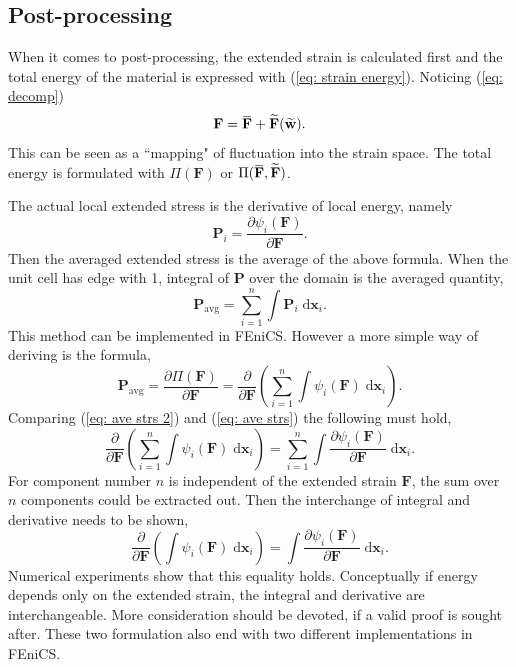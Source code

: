 \documentclass[10pt,a4paper]{scrreprt}
\newcommand{\myd}{\;\mathrm{d}}
\newcommand{\overbar}[1]{\mkern 1.5mu\overline{\mkern-1.5mu#1\mkern-1.5mu}\mkern 1.5mu}
\begin{document}
\subsection{Post-processing}
When it comes to post-processing, the extended strain is calculated first and the total energy of the material is expressed with (\ref{eq: strain energy}). Noticing (\ref{eq: decomp})
\begin{equation}
\mathbf{F} = \overbar{\mathbf{F}} + \widetilde{\mathbf{F}}(\widetilde{\mathbf{w}}).
\end{equation}
This can be seen as a ``mapping" of fluctuation into the strain space. The total energy is formulated with $\Pi(\mathbf{F})$ or $\Pi(\overbar{\mathbf{F}},\widetilde{\mathbf{F}})$.

The actual local extended stress is the derivative of local energy, namely
\begin{equation}
\label{eq: loc en}
\mathbf{P}_{i} = \dfrac{\partial \psi_{i}(\mathbf{F})}{\partial \mathbf{F}}.
\end{equation}
Then the averaged extended stress is the average of the above formula. When the unit cell has edge with 1, integral of $\mathbf{P}$ over the domain is the averaged quantity,
\begin{equation}
\label{eq: ave strs}
\mathbf{P}_{\text{avg}} = \sum^{n}_{i=1} \int \mathbf{P}_{i} \myd{\mathbf{x}_{i}}.
\end{equation}
This method can be implemented in FEniCS. However a more simple way of deriving is the formula,
\begin{equation}
\label{eq: ave strs 2}
\mathbf{P}_{\text{avg}} = \dfrac{\partial \Pi(\mathbf{F})}{\partial \mathbf{F}} = \dfrac{\partial}{\partial \mathbf{F}} \left( \sum^{n}_{i=1} \int \psi_{i}(\mathbf{F}) \myd{\mathbf{x}_{i}} \right).
\end{equation}
Comparing (\ref{eq: ave strs 2}) and (\ref{eq: ave strs}) the following must hold,
\begin{equation}
\label{eq: equality}
\dfrac{\partial}{\partial \mathbf{F}} \left( \sum^{n}_{i=1} \int \psi_{i}(\mathbf{F}) \myd{\mathbf{x}_{i}} \right) = \sum^{n}_{i=1} \int \dfrac{\partial \psi_{i}(\mathbf{F})}{\partial \mathbf{F}} \myd{\mathbf{x}_{i}}.
\end{equation}
For component number $n$ is independent of the extended strain $\mathbf{F}$, the sum over $n$ components could be extracted out. Then the interchange of integral and derivative needs to be shown, 
\begin{equation}
\label{eq: interchange}
\dfrac{\partial}{\partial \mathbf{F}} \left( \int \psi_{i}(\mathbf{F}) \myd{\mathbf{x}_{i}} \right) = \int \dfrac{\partial \psi_{i}(\mathbf{F})}{\partial \mathbf{F}} \myd{\mathbf{x}_{i}}.
\end{equation}
Numerical experiments show that this equality holds. Conceptually if energy depends only on the extended strain, the integral and derivative are interchangeable. More consideration should be devoted, if a valid proof is sought after. These two formulation also end with two different implementations in FEniCS.
\end{document}
